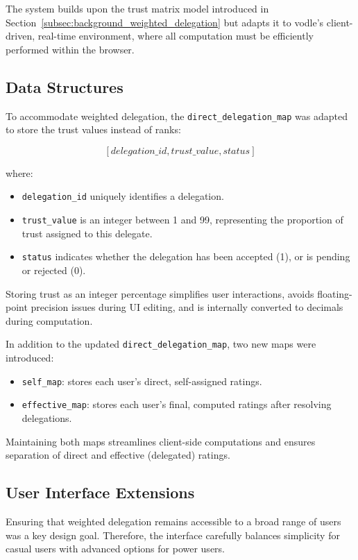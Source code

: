 The system builds upon the trust matrix model introduced in Section~\ref{subsec:background_weighted_delegation} but adapts it to vodle's client-driven, real-time environment, where all computation must be efficiently performed within the browser.

\subsection{Data Structures}

To accommodate weighted delegation, the \texttt{direct\_delegation\_map} was adapted to store the trust values instead of ranks:

\[
[delegation\_id, trust\_value, status]
\]

where:
\begin{itemize}
    \item \texttt{delegation\_id} uniquely identifies a delegation.
    \item \texttt{trust\_value} is an integer between 1 and 99, representing the proportion of trust assigned to this delegate.
    \item \texttt{status} indicates whether the delegation has been accepted (1), or is pending or rejected (0).
\end{itemize}

Storing trust as an integer percentage simplifies user interactions, avoids floating-point precision issues during UI editing, and is internally converted to decimals during computation.

In addition to the updated \texttt{direct\_delegation\_map}, two new maps were introduced:
\begin{itemize}
    \item \texttt{self\_map}: stores each user's direct, self-assigned ratings.
    \item \texttt{effective\_map}: stores each user's final, computed ratings after resolving delegations.
\end{itemize}

Maintaining both maps streamlines client-side computations and ensures separation of direct and effective (delegated) ratings.

\subsection{User Interface Extensions}

Ensuring that weighted delegation remains accessible to a broad range of users was a key design goal. Therefore, the interface carefully balances simplicity for casual users with advanced options for power users.

